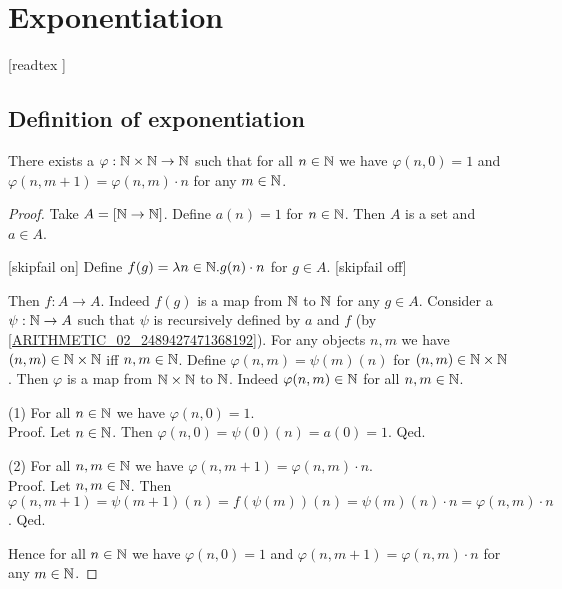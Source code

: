 \documentclass[../arithmetic.tex]{subfiles}
\begin{document}
  \chapter{Exponentiation}\label{chapter:exponentiation}


  \begin{forthel}

    [readtex ]

  \end{forthel}


  \section{Definition of exponentiation}

  \begin{forthel}
    \begin{lemma}
      There exists a $\varphi : \mathbb{N} \times \mathbb{N} \to \mathbb{N}$ such
      that for all $n \in \mathbb{N}$ we have $\varphi(n, 0) = 1$ and
      $\varphi(n, m \plus 1) = \varphi(n,m) \cdot n$ for any $m \in \mathbb{N}$.
    \end{lemma}
    \begin{proof}
      Take $A = [\mathbb{N}\to\mathbb{N}]$.
      Define $a(n) = 1$ for $n \in \mathbb{N}$.
      Then $A$ is a set and $a \in A$.

      [skipfail on] %
      Define $f(g) = \mathrm{\lambda} n \in \mathbb{N}. g(n) \cdot n$ for $g \in A$.
      [skipfail off]

      Then $f : A \to A$.
      Indeed $f(g)$ is a map from $\mathbb{N}$ to $\mathbb{N}$ for any $g \in A$.
      Consider a $\psi : \mathbb{N} \to A$ such that $\psi$ is recursively defined by
      $a$ and $f$ (by \cref{ARITHMETIC_02_2489427471368192}).
      For any objects $n, m$ we have $(n,m) \in \mathbb{N} \times \mathbb{N}$ iff
      $n, m \in \mathbb{N}$.
      Define $\varphi(n,m) = \psi(m)(n)$ for $(n,m) \in \mathbb{N} \times \mathbb{N}$.
      Then $\varphi$ is a map from $\mathbb{N} \times \mathbb{N}$ to $\mathbb{N}$.
      Indeed $\varphi(n,m) \in \mathbb{N}$ for all $n, m \in \mathbb{N}$.

      (1) For all $n \in \mathbb{N}$ we have $\varphi(n,0) = 1$. \\
      Proof.
        Let $n \in \mathbb{N}$.
        Then $\varphi(n,0)
          = \psi(0)(n)
          = a(0)
          = 1$.
      Qed.

      (2) For all $n, m \in \mathbb{N}$ we have $\varphi(n, m \plus 1) =
      \varphi(n,m) \cdot n$. \\
      Proof.
        Let $n, m \in \mathbb{N}$.
        Then $\varphi(n, m \plus 1)
          = \psi(m \plus 1)(n)
          = f(\psi(m))(n)
          = \psi(m)(n) \cdot n
          = \varphi(n,m) \cdot n$.
      Qed.

      Hence for all $n \in \mathbb{N}$ we have $\varphi(n, 0) = 1$ and
      $\varphi(n, m \plus 1) = \varphi(n,m) \cdot n$ for any $m \in \mathbb{N}$.
    \end{proof}
  \end{forthel}
\end{document}

